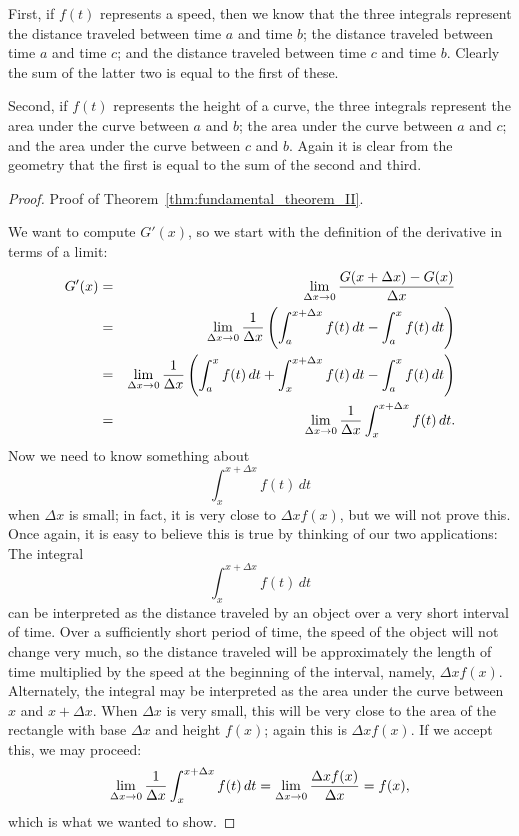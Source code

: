 First, if $f(t)$ represents a speed, then we know that the three
integrals represent the distance traveled between time $a$ and time $b$;
the distance traveled between time $a$ and time $c$; and 
the distance traveled between time $c$ and time $b$. Clearly the sum of
the latter two is equal to the first of these.

Second, if $f(t)$ represents the height of a curve, the three
integrals represent the area under the curve between $a$ and $b$;
the area under the curve between $a$ and $c$;
and the area under the curve between $c$ and $b$. Again it is clear
from the geometry that the first is equal to the sum of the second and
third. 

\begin{proof} Proof of Theorem~\ref{thm:fundamental_theorem_II}.

We want to compute $G'(x)$, so we start with the definition of the
derivative in terms of a limit:
\begin{eqnarray*}
  G'(x)&=&\lim_{\Delta x\to0}{G(x+\Delta x)-G(x)\over\Delta x}\cr
  &=&\lim_{\Delta x\to0}{1\over \Delta x}\left(
  \int_a^{x+\Delta x} f(t)\,dt - \int_a^x f(t)\,dt\right)\cr
  &=&\lim_{\Delta x\to0}{1\over \Delta x}\left(
  \int_a^{x} f(t)\,dt + \int_x^{x+\Delta x} f(t)\,dt - 
  \int_a^x f(t)\,dt\right)\cr
  &=&\lim_{\Delta x\to0}{1\over \Delta x}\int_x^{x+\Delta x} f(t)\,dt.\cr
\end{eqnarray*}
Now we need to know something about 
$$
  \int_x^{x+\Delta x} f(t)\,dt
$$
when $\Delta x$ is small; in fact, it is very close to 
$\Delta x f(x)$, but we will not prove this. Once again, it is easy to
believe this is true by thinking of our two applications:
The integral 
$$
  \int_x^{x+\Delta x} f(t)\,dt
$$
can be interpreted as the distance traveled by an object over a very
short interval of time. Over a sufficiently short period of time, the
speed of the object will not change very much, so the distance
traveled will be approximately the length of time multiplied by the
speed at the beginning of the interval, namely, $\Delta x
f(x)$. Alternately, the integral may be interpreted as the area under
the curve between $x$ and $x+\Delta x$. When $\Delta x$ is very small,
this will be very close to the area of the rectangle with base $\Delta
x$ and height $f(x)$; again this is $\Delta x
f(x)$. If we accept this, we may proceed:
$$
  \lim_{\Delta x\to0}{1\over \Delta x}\int_x^{x+\Delta x} f(t)\,dt
  =\lim_{\Delta x\to0}{\Delta x f(x)\over \Delta x}=f(x),
$$
which is what we wanted to show.
\end{proof}

